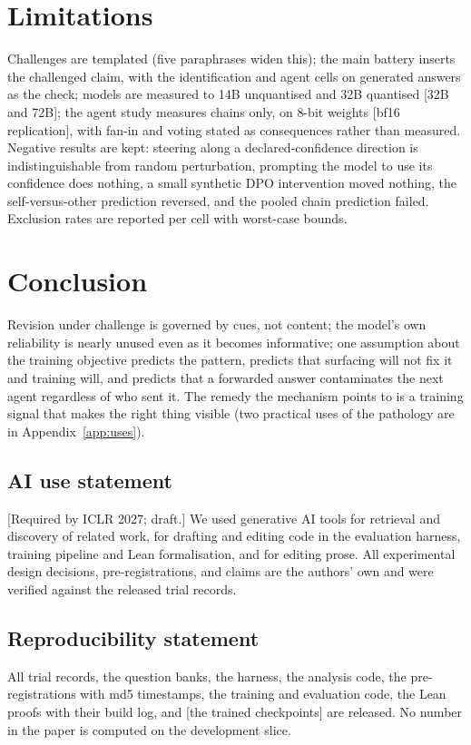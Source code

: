 \documentclass{article}
\newcommand{\pending}[1]{\textcolor{blue!70!black}{[#1]}}
\begin{document}
\section{Limitations}
Challenges are templated (five paraphrases widen this); the main battery inserts the challenged claim, with the identification and agent cells on generated answers as the check; models are measured to 14B unquantised and 32B quantised \pending{32B and 72B}; the agent study measures chains only, on 8-bit weights \pending{bf16 replication}, with fan-in and voting stated as consequences rather than measured. Negative results are kept: steering along a declared-confidence direction is indistinguishable from random perturbation, prompting the model to use its confidence does nothing, a small synthetic DPO intervention moved nothing, the self-versus-other prediction reversed, and the pooled chain prediction failed. Exclusion rates are reported per cell with worst-case bounds.

\section{Conclusion}
Revision under challenge is governed by cues, not content; the model's own reliability is nearly unused even as it becomes informative; one assumption about the training objective predicts the pattern, predicts that surfacing will not fix it and training will, and predicts that a forwarded answer contaminates the next agent regardless of who sent it. The remedy the mechanism points to is a training signal that makes the right thing visible (two practical uses of the pathology are in Appendix~\ref{app:uses}).

\subsection*{AI use statement}
\pending{Required by ICLR 2027; draft.} We used generative AI tools for retrieval and discovery of related work, for drafting and editing code in the evaluation harness, training pipeline and Lean formalisation, and for editing prose. All experimental design decisions, pre-registrations, and claims are the authors' own and were verified against the released trial records.

\subsection*{Reproducibility statement}
All trial records, the question banks, the harness, the analysis code, the pre-registrations with md5 timestamps, the training and evaluation code, the Lean proofs with their build log, and \pending{the trained checkpoints} are released. No number in the paper is computed on the development slice.
\end{document}
